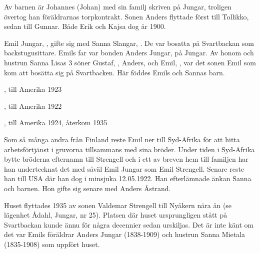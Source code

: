 Av barnen är Johannes (Johan) med sin familj skriven på Jungar, troligen övertog han föräldrarnas torpkontrakt. Sonen Anders flyttade först till Tollikko, sedan till Gunnar. Både Erik och Kajsa dog år 1900.



%


%
Emil Jungar, ,  gifte sig med Sanna Slangar, . De var bosatta på Svartbackan som backstugusittare. Emils far var bonden Anders Jungar,  på Jungar. Av honom och hustrun Sanna Lisas 3 söner Gustaf, , Anders,  och Emil, , var det sonen Emil som kom att bosätta sig på Svartbacken. Här föddes Emils och Sannas barn.
\begin{jhchildren}
  \item {}, till Amerika 1923
  \item {}, till Amerika 1922
  \item {}, till Amerika 1924, återkom 1935
\end{jhchildren}

Som så många andra från Finland reste Emil ner till Syd-Afrika för att hitta arbetsförtjänst i gruvorna tillsammans med sina bröder. Under tiden i Syd-Afrika bytte bröderna efternamn till Strengell och i ett av breven hem till familjen har han undertecknat det med såväl Emil Jungar som Emil Strengell. Senare reste han till USA där han dog i  minsjuka 12.05.1922. Han efterlämnade änkan Sanna och barnen. Hon gifte sig senare med Anders Åstrand.

Huset flyttades 1935 av sonen Valdemar Strengell till Nyåkern nära ån (se lägenhet Ådahl, Jungar, nr 25). Platsen där huset ursprungligen stått på Svartbackan kunde ännu för några decennier sedan urskiljas. Det är inte känt om det var Emils föräldrar Anders Jungar (1838-1909) och hustrun Sanna \textborn Mietala (1835-1908) som uppfört huset.
